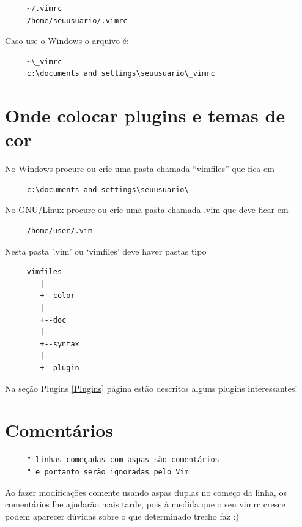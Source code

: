 \documentclass[10pt,a4paper,openany]{book}
\begin{document}
\begin{verbatim}
     ~/.vimrc
     /home/seuusuario/.vimrc
\end{verbatim}

Caso use o Windows o arquivo é:

\begin{verbatim}
     ~\_vimrc
     c:\documents and settings\seuusuario\_vimrc
\end{verbatim}

\section{Onde colocar plugins e temas de cor}
\label{Onde colocar plugins e temas de cor}

No Windows procure ou crie uma pasta chamada ``vimfiles'' que fica em

\begin{verbatim}
     c:\documents and settings\seuusuario\
\end{verbatim}

No GNU/Linux procure ou crie uma pasta chamada .vim que deve ficar em

\begin{verbatim}
     /home/user/.vim
\end{verbatim}

Nesta pasta '.vim' ou `vimfiles' deve haver pastas tipo

\begin{verbatim}
     vimfiles
        |
        +--color
        |
        +--doc
        |
        +--syntax
        |
        +--plugin
\end{verbatim}

Na seção Plugins \ref{Plugins} página \pageref{Plugins}
estão descritos alguns plugins interessantes!

\section{Comentários }
\label{Comentários }

\begin{verbatim}
     " linhas começadas com aspas são comentários
     " e portanto serão ignoradas pelo Vim
\end{verbatim}

Ao fazer modificações comente usando aspas duplas no começo da linha,
os comentários lhe ajudarão mais tarde, pois à medida que o seu vimrc
cresce podem aparecer dúvidas sobre o que determinado trecho faz :)
\end{document}
